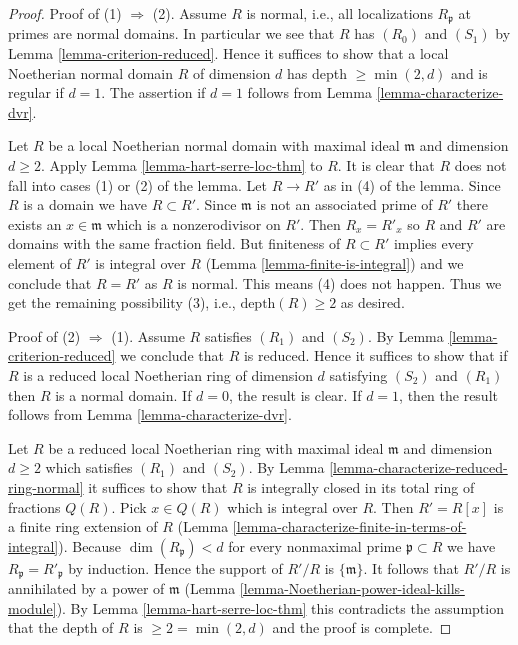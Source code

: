 \begin{proof}
Proof of (1) $\Rightarrow$ (2). Assume $R$ is normal, i.e., all
localizations $R_{\mathfrak p}$ at primes are normal domains.
In particular we see that $R$ has $(R_0)$ and $(S_1)$ by
Lemma \ref{lemma-criterion-reduced}. Hence it suffices to show
that a local Noetherian normal domain $R$ of dimension $d$ has
depth $\geq \min(2, d)$ and is regular if $d = 1$. The assertion
if $d = 1$ follows from Lemma \ref{lemma-characterize-dvr}.

\medskip\noindent
Let $R$ be a local Noetherian normal domain with maximal ideal
$\mathfrak m$ and dimension $d \geq 2$. Apply
Lemma \ref{lemma-hart-serre-loc-thm} to $R$.
It is clear that $R$ does not fall into cases (1) or (2)
of the lemma.
Let $R \to R'$ as in (4) of the lemma.
Since $R$ is a domain we have $R \subset R'$. Since $\mathfrak m$
is not an associated prime of $R'$ there exists an $x \in \mathfrak m$
which is a nonzerodivisor on $R'$. Then $R_x = R'_x$ so
$R$ and $R'$ are domains with the same fraction field. But
finiteness of $R \subset R'$ implies every element of $R'$ is integral
over $R$ (Lemma \ref{lemma-finite-is-integral})
and we conclude that $R = R'$ as $R$ is normal.
This means (4) does not happen. Thus we get the remaining possibility
(3), i.e., $\text{depth}(R) \geq 2$ as desired.

\medskip\noindent
Proof of (2) $\Rightarrow$ (1). Assume $R$ satisfies $(R_1)$ and $(S_2)$.
By Lemma \ref{lemma-criterion-reduced} we conclude that $R$ is
reduced. Hence it suffices to show that if $R$ is a reduced local
Noetherian ring of dimension $d$ satisfying $(S_2)$ and $(R_1)$
then $R$ is a normal domain. If $d = 0$, the result is clear.
If $d = 1$, then the result follows from Lemma \ref{lemma-characterize-dvr}.

\medskip\noindent
Let $R$ be a reduced local Noetherian ring with maximal ideal
$\mathfrak m$ and dimension $d \geq 2$ which satisfies $(R_1)$ and
$(S_2)$. By Lemma \ref{lemma-characterize-reduced-ring-normal}
it suffices to show that $R$ is integrally closed in its
total ring of fractions $Q(R)$. Pick $x \in Q(R)$ which is integral
over $R$. Then $R' = R[x]$ is a finite ring extension of $R$
(Lemma \ref{lemma-characterize-finite-in-terms-of-integral}).
Because $\dim(R_\mathfrak p) < d$ for
every nonmaximal prime $\mathfrak p \subset R$
we have $R_\mathfrak p = R'_\mathfrak p$ by induction.
Hence the support of $R'/R$ is $\{\mathfrak m\}$.
It follows that $R'/R$ is annihilated by a power of $\mathfrak m$
(Lemma \ref{lemma-Noetherian-power-ideal-kills-module}).
By Lemma \ref{lemma-hart-serre-loc-thm} this
contradicts the assumption that the depth of $R$ is $\geq 2 = \min(2, d)$
and the proof is complete.
\end{proof}

